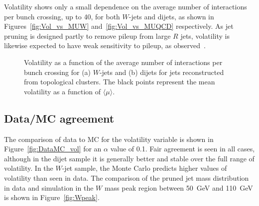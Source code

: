 Volatility shows only a small dependence on the average number of interactions per bunch crossing, up to 40, for both $W$-jets and dijets, as shown in Figures~\ref{fig:Vol_vs_MUW} and~\ref{fig:Vol_vs_MUQCD} respectively. As jet pruning is designed partly to remove pileup from large $R$ jets, volatility is likewise expected to have weak sensitivity to pileup, as observed~\cite{Ellis2009a,Chatrchyan:2013rla}. 

\begin{figure}[htbp]
\centering
{}
\caption{Volatility as a function of the average number of interactions per bunch crossing for (a) $W$-jets and (b) dijets for jets reconstructed from topological clusters. The black points represent the mean volatility as a function of $\langle\mu\rangle$.}
\end{figure}

\subsection{Data/MC agreement}
\label{app:qjets:jetvol:datamc}

The comparison of data to MC for the volatility variable is shown in Figure~\ref{fig:DataMC_vol} for an $\alpha$ value of 0.1. Fair agreement is seen in all cases, although in the dijet sample it is generally better and stable over the full range of volatility. In the $W$-jet sample, the Monte Carlo predicts higher values of volatility than seen in data. The comparison of the pruned jet mass distribution in data and simulation in the $W$ mass peak region between 50~GeV and 110~GeV is shown in Figure~\ref{fig:Wpeak}.

